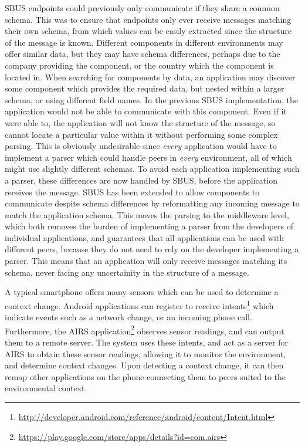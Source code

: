 \documentclass[12pt,twoside,notitlepage]{report}
\begin{document}
SBUS endpoints could previously only communicate if they share a common schema. 
This was to ensure that endpoints only ever receive messages matching their own schema, from which values can be easily extracted since the structure of the message is known. 
Different components in different environments may offer similar data, but they may have schema differences, perhaps due to the company providing the component, or the country which the component is located in. 
When searching for components by data, an application may discover some component which provides the required data, but nested within a larger schema, or using different field names. 
In the previous SBUS implementation, the application would not be able to communicate with this component. 
Even if it were able to, the application will not know the structure of the message, so cannot locate a particular value within it without performing some complex parsing. 
This is obviously undesirable since {\sl every} application would have to implement a parser which could handle peers in {\sl every} environment, all of which might use slightly different schemas.
To avoid each application implementing such a parser, these differences are now handled by SBUS, before the application receives the message. 
SBUS has been extended to allow components to communicate despite schema differences by reformatting any incoming message to match the application schema. 
This moves the parsing to the middleware level, which both removes the burden of implementing a parser from the developers of individual applications, and guarantees that all applications can be used with different peers, because they do not need to rely on the developer implementing a parser. 
This means that an application will only receive messages matching its schema, never facing any uncertainity in the structure of a message. 

A typical smartphone offers many sensors which can be used to determine a context change. 
Android applications can register to receive intents\footnote{\url{http://developer.android.com/reference/android/content/Intent.html}} which indicate events such as a network change, or an incoming phone call. 
Furthermore, the AIRS application\footnote{\url{https://play.google.com/store/apps/details?id=com.airs}} observes sensor readings, and can output them to a remote server.
The system uses these intents, and act as a server for AIRS to obtain these sensor readings, allowing it to monitor the environment, and determine context changes. 
Upon detecting a context change, it can then remap other applications on the phone connecting them to peers suited to the environmental context. 
\end{document}
